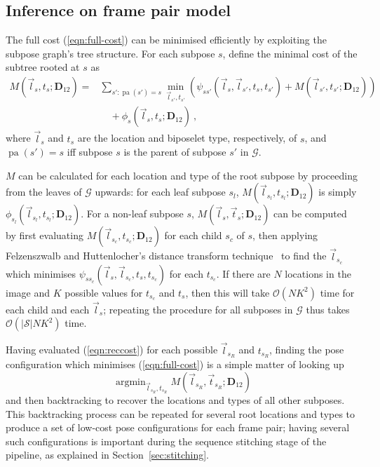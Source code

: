 \documentclass[runningheads]{llncs}
\newcommand{\mat}{\mathbf}
\DeclareMathOperator{\pa}{pa}
\DeclareMathOperator{\argmin}{arg min}
\begin{document}

\subsection{Inference on frame pair model}

The full cost (\ref{eqn:full-cost}) can be minimised efficiently by exploiting
the subpose graph's tree structure. For each subpose $s$, define the minimal
cost of the subtree rooted at $s$ as
%
\begin{equation}\label{eqn:reccost}
\begin{split}
M(\vec l_s, t_s; \mat D_{12}) =
&\sum_{s' : \pa(s') = s} \min_{\vec l_{s'}, t_{s'}} \left(\psi_{s s'}(\vec l_s,
\vec l_{s'}, t_s, t_{s'}) + M(\vec l_{s'}, t_{s'}; \mat D_{12})\right)
\\&\quad+ \phi_s(\vec l_s, t_s; \mat D_{12})~,
\end{split}
\end{equation}
%
where $\vec l_s$ and $t_s$ are the location and biposelet type, respectively, of
$s$, and $\pa(s') = s$ iff subpose $s$ is the parent of subpose $s'$ in
$\mathcal G$.

$M$ can be calculated for each location and type of the root subpose by
proceeding from the leaves of $\mathcal G$ upwards: for each leaf subpose $s_l$,
$M(\vec l_{s_l}, t_{s_l}; \mat D_{12})$ is simply $\phi_{s_l}(\vec l_{s_l},
t_{s_l}; \mat D_{12})$. For a non-leaf subpose $s$, $M(\vec l_s, \vec t_s; \mat
D_{12})$ can be computed by first evaluating $M(\vec l_{s_c}, t_{s_c}; \mat
D_{12})$ for each child $s_c$ of $s$, then applying Felzenszwalb and
Huttenlocher's distance transform technique~\cite{felzenszwalb2012distance} to
find the $\vec l_{s_c}$ which minimises $\psi_{s s_c}(\vec l_s, \vec l_{s_c},
t_s, t_{s_c})$ for each $t_{s_c}$. If there are $N$ locations in the image and
$K$ possible values for $t_{s_c}$ and $t_s$, then this will take $\mathcal O(N
K^2)$ time for each child and each $\vec l_s$; repeating the procedure for all
subposes in $\mathcal G$ thus takes $\mathcal O(|\mathcal S| N K^2)$ time.

Having evaluated (\ref{eqn:reccost}) for each possible $\vec l_{s_R}$ and
$t_{s_R}$, finding the pose configuration which minimises (\ref{eqn:full-cost})
is a simple matter of looking up
%
\begin{equation}
\argmin_{\vec l_{s_R}, t_{s_R}} M(\vec l_{s_R}, \vec t_{s_R}; \mat D_{12})
\end{equation}
%
and then backtracking to recover the locations and types of all other subposes.
This backtracking process can be repeated for several root locations and types
to produce a set of low-cost pose configurations for each frame pair; having
several such configurations is important during the sequence stitching stage of
the pipeline, as explained in Section~\ref{sec:stitching}.
\end{document}
